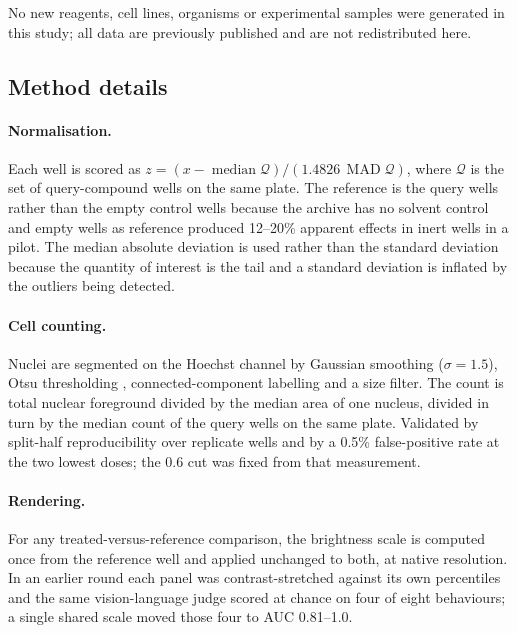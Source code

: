 \documentclass[11pt]{article}
\begin{document}
\vspace{0.6em}
\noindent No new reagents, cell lines, organisms or experimental samples were generated in
this study; all data are previously published and are not redistributed here.

\subsection*{Method details}

\paragraph{Normalisation.} Each well is scored as
$z = (x - \operatorname{median}\mathcal{Q})/(1.4826\,\operatorname{MAD}\mathcal{Q})$, where
$\mathcal{Q}$ is the set of query-compound wells on the same plate. The reference is the
query wells rather than the empty control wells because the archive has no solvent control
and empty wells as reference produced 12--20\% apparent effects in inert wells in a pilot.
The median absolute deviation is used rather than the standard deviation because the
quantity of interest is the tail and a standard deviation is inflated by the outliers being
detected.

\paragraph{Cell counting.} Nuclei are segmented on the Hoechst channel by Gaussian smoothing
($\sigma = 1.5$), Otsu thresholding \citep{otsu1979threshold}, connected-component labelling
and a size filter. The count is total nuclear foreground divided by the median area of one
nucleus, divided in turn by the median count of the query wells on the same plate. Validated
by split-half reproducibility over replicate wells and by a 0.5\% false-positive rate at the
two lowest doses; the 0.6 cut was fixed from that measurement.

\paragraph{Rendering.} For any treated-versus-reference comparison, the brightness scale is
computed once from the reference well and applied unchanged to both, at native resolution.
In an earlier round each panel was contrast-stretched against its own percentiles and the
same vision-language judge scored at chance on four of eight behaviours; a single shared
scale moved those four to AUC 0.81--1.0.
\end{document}

